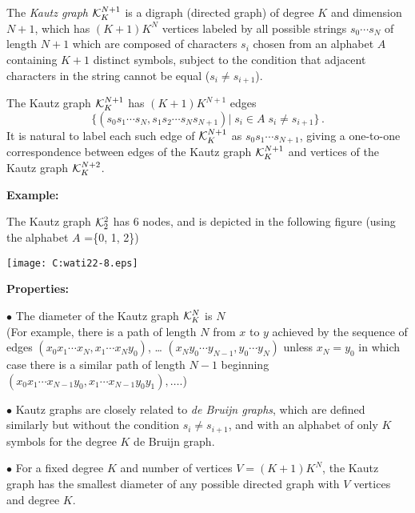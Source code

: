 \documentclass[12pt]{article}
\begin{document}
\noindent
The {\em Kautz graph} ${\cal K}_K^{N + 1}$ is a digraph (directed
graph) of degree $K$ and dimension $N+ 1$, which has $(K +1)K^{N}$
vertices labeled by all possible strings $s_0 \cdots s_N$ of length $N
+ 1$ which are composed of characters $s_i$ chosen from an alphabet
$A$ containing $K + 1$ distinct symbols, subject to the condition that
adjacent characters in the string cannot be equal ($s_i \neq s_{i+
1}$).
\vspace*{0.1in}

\noindent
The Kautz graph  ${\cal K}_K^{N + 1}$ has $(K + 1)K^{N + 1}$ edges
\begin{equation}
\{(s_0 s_1 \cdots s_N,
s_1 s_2 \cdots s_N s_{N + 1})| \; s_i \in A \; s_i \neq s_{i
  + 1} \} \,.
\label{eq:}
\end{equation}
It is natural to label each such edge of  ${\cal K}_K^{N + 1}$
as $s_0s_1 \cdots s_{N + 1}$, giving a one-to-one correspondence
between edges of    the Kautz graph  ${\cal K}_K^{N + 1}$
and vertices of the Kautz graph
${\cal K}_K^{N + 2}$.
\vspace*{0.1in}

\noindent
{\bf Example:}

\noindent
The Kautz graph   ${\cal K}_2^{2}$ has 6 nodes, and is depicted in the
following figure (using the alphabet $A$ =\{0, 1, 2\})

\begin{center}
\texttt{[image: C:wati22-8.eps]}
\end{center}

\vspace*{0.1in}

\noindent
{\bf Properties:}

\noindent $\bullet$
The diameter of the Kautz graph
${\cal K}_K^{N}$ is $N$ \\
(For example, there is a path of length $N$ from $x$ to $y$
achieved by the
sequence of edges $(x_0 x_1 \cdots x_N, x_1 \cdots x_N y_0)$, \ldots
$(x_N y_0 \cdots y_{N -1}, y_0 \cdots y_N)$ unless $x_N = y_0$ in
which case there is a similar path of length $N -1$ beginning
$(x_0 x_1 \cdots x_{N-1} y_0, x_1 \cdots x_{N-1} y_0 y_1), \ldots$.)

\noindent $\bullet$ 
Kautz graphs are closely related to {\em de Bruijn graphs}, which are
defined similarly but without the condition $s_i \neq s_{i + 1}$, and
with an alphabet of only $K$ symbols for the degree $K$ de Bruijn graph.

\noindent $\bullet$
For a fixed degree $K$ and number of vertices $V = (K + 1) K^N$, the
Kautz graph has the smallest diameter of any possible directed graph
with $V$ vertices and degree $K$.
\end{document}
